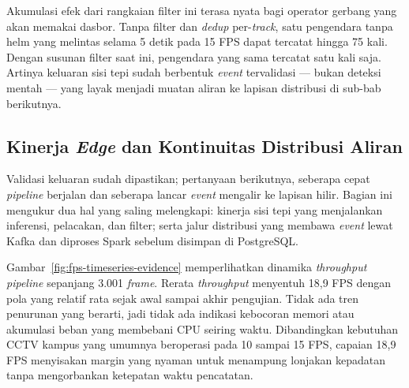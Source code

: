 Akumulasi efek dari rangkaian filter ini terasa nyata bagi operator gerbang yang akan memakai dasbor. Tanpa filter dan \textit{dedup} per-\textit{track}, satu pengendara tanpa helm yang melintas selama 5 detik pada 15 FPS dapat tercatat hingga 75 kali. Dengan susunan filter saat ini, pengendara yang sama tercatat satu kali saja. Artinya keluaran sisi tepi sudah berbentuk \textit{event} tervalidasi --- bukan deteksi mentah --- yang layak menjadi muatan aliran ke lapisan distribusi di sub-bab berikutnya.

\subsection{Kinerja \textit{Edge} dan Kontinuitas Distribusi Aliran}
\label{subsec:kinerja-edge-distribusi}

Validasi keluaran sudah dipastikan; pertanyaan berikutnya, seberapa cepat \textit{pipeline} berjalan dan seberapa lancar \textit{event} mengalir ke lapisan hilir. Bagian ini mengukur dua hal yang saling melengkapi: kinerja sisi tepi yang menjalankan inferensi, pelacakan, dan filter; serta jalur distribusi yang membawa \textit{event} lewat Kafka dan diproses Spark sebelum disimpan di PostgreSQL.

Gambar~\ref{fig:fps-timeseries-evidence} memperlihatkan dinamika \textit{throughput} \textit{pipeline} sepanjang 3.001 \textit{frame}. Rerata \textit{throughput} menyentuh 18,9 FPS dengan pola yang relatif rata sejak awal sampai akhir pengujian. Tidak ada tren penurunan yang berarti, jadi tidak ada indikasi kebocoran memori atau akumulasi beban yang membebani CPU seiring waktu. Dibandingkan kebutuhan CCTV kampus yang umumnya beroperasi pada 10 sampai 15 FPS, capaian 18,9 FPS menyisakan margin yang nyaman untuk menampung lonjakan kepadatan tanpa mengorbankan ketepatan waktu pencatatan.

